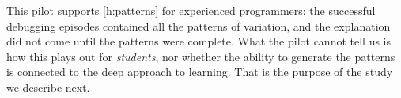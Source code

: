 This pilot supports \cref{h:patterns} for experienced programmers: the
successful debugging episodes contained all the patterns of variation, and the
explanation did not come until the patterns were complete.
What the pilot cannot tell us is how this plays out for \emph{students}, nor
whether the ability to generate the patterns is connected to the deep approach
to learning.
That is the purpose of the study we describe next.
